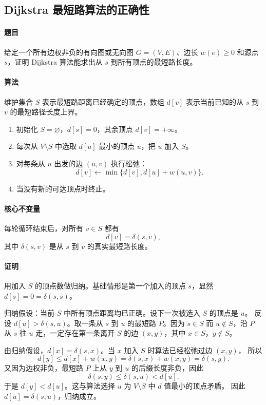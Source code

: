 \documentclass[UTF8,openany,12pt]{ctexbook}
\theoremstyle{remark}
\begin{document}
\subsection{Dijkstra 最短路算法的正确性}

\paragraph{题目}
给定一个所有边权非负的有向图或无向图 $G=(V,E)$、边长 $w(e)\ge 0$ 和源点
$s$，证明 Dijkstra 算法能求出从 $s$ 到所有顶点的最短路长度。

\paragraph{算法}
维护集合 $S$ 表示最短路距离已经确定的顶点，数组 $d[v]$ 表示当前已知的从 $s$ 到
$v$ 的最短路径长度上界。
\begin{enumerate}
  \item 初始化 $S=\varnothing$，$d[s]=0$，其余顶点 $d[v]=+\infty$。
  \item 每次从 $V\setminus S$ 中选取 $d[u]$ 最小的顶点 $u$，把 $u$ 加入 $S$。
  \item 对每条从 $u$ 出发的边 $(u,v)$ 执行松弛：
  \[
    d[v]\gets \min\{d[v],d[u]+w(u,v)\}.
  \]
  \item 当没有新的可达顶点时终止。
\end{enumerate}

\paragraph{核心不变量}
每轮循环结束后，对所有 $v\in S$ 都有
\[
  d[v]=\delta(s,v),
\]
其中 $\delta(s,v)$ 是从 $s$ 到 $v$ 的真实最短路长度。

\paragraph{证明}
用加入 $S$ 的顶点数做归纳。基础情形是第一个加入的顶点 $s$，显然
$d[s]=0=\delta(s,s)$。

归纳假设：当前 $S$ 中所有顶点距离均已正确。设下一次被选入 $S$ 的顶点是 $u$。
反设 $d[u]>\delta(s,u)$。取一条从 $s$ 到 $u$ 的最短路 $P$。因为 $s\in S$
而 $u\notin S$，沿 $P$ 从 $s$ 往 $u$ 走，一定存在第一条离开 $S$ 的边
$(x,y)$，其中 $x\in S$，$y\notin S$。

由归纳假设，$d[x]=\delta(s,x)$。当 $x$ 加入 $S$ 时算法已经松弛过边 $(x,y)$，
所以
\[
  d[y]\le d[x]+w(x,y)=\delta(s,x)+w(x,y)=\delta(s,y).
\]
又因为边权非负，最短路 $P$ 上从 $y$ 到 $u$ 的后缀长度非负，因此
\[
  \delta(s,y)\le \delta(s,u)<d[u].
\]
于是 $d[y]<d[u]$。这与算法选择 $u$ 为 $V\setminus S$ 中 $d$ 值最小的顶点矛盾。
因此 $d[u]=\delta(s,u)$，归纳成立。
\end{document}
